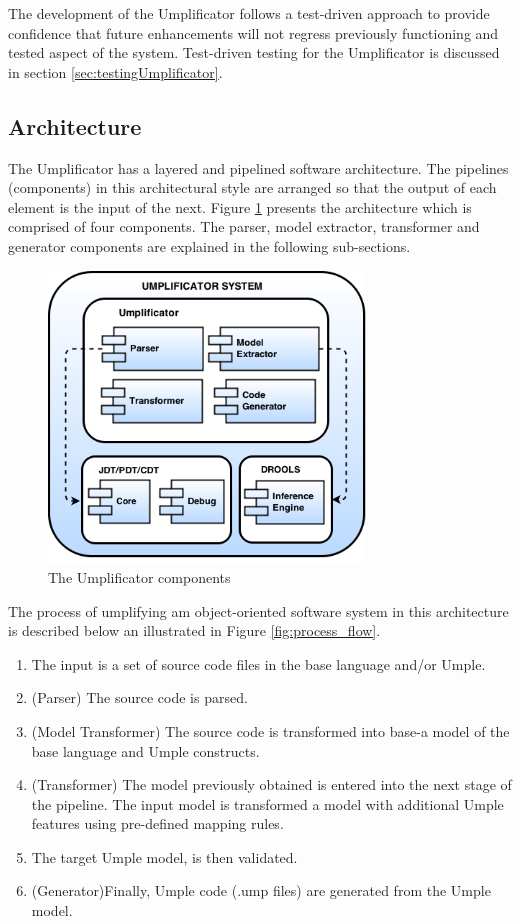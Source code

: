 The development of the Umplificator follows a test-driven approach to provide confidence that future enhancements will not regress previously functioning and tested aspect of the system. Test-driven testing for the Umplificator is discussed in section \ref{sec:testingUmplificator}. 

\subsection{Architecture}
\label{sec:architecture}

The Umplificator has a layered and pipelined software architecture. The pipelines (components) in this architectural style are arranged so that the output of each element is the input of the next.  Figure \ref{fig:architecture} presents the architecture which is comprised  of four components. The parser, model extractor, transformer and generator components are explained in the following sub-sections.

\begin{figure}[!t]
\centering
\includegraphics[width=0.75\textwidth]{Figures/UmplificatorComponents.png} 
\caption{The Umplificator components}
\label{fig:architecture}
\end{figure}

The process of umplifying am object-oriented software system in this architecture is described below an illustrated in Figure \ref{fig:process_flow}.

\begin{enumerate}
\item  The input is a set of source code files in the base language and/or Umple.
\item (Parser) The source code is parsed. 
\item (Model Transformer) The source code is transformed into base-a model of the base language and Umple constructs.
\item (Transformer) The model previously obtained is entered into the next stage of the pipeline. The input model is transformed a model with additional Umple features using pre-defined mapping rules. 
\item The target Umple model, is then validated. 
\item (Generator)Finally, Umple code (.ump files) are generated from the Umple model.
\end{enumerate}

